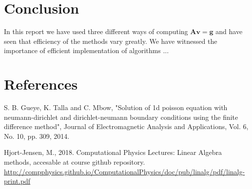 \documentclass[american,a4paper,12pt]{article}
\renewcommand{\vec}[1]{\mathbf{#1}} %
\begin{document}
\section{Conclusion}
In this report we have used three different ways of computing $\vec{A}\vec{v} = \vec{g}$ and have seen that efficiency of the methods vary greatly. We have witnessed the importance of efficient implementation of algorithms ...


\section{References} %

\begin{thebibliography}{9}
   S. B. Gueye, K. Talla and C. Mbow, "Solution of 1d poisson equation with neumann-dirichlet and dirichlet-neumann boundary conditions using the finite difference method", Journal of Electromagnetic Analysis and Applications, Vol. 6, No. 10, pp. 309, 2014.

   Hjort-Jensen, M., 2018. Computational Physics Lectures: Linear Algebra methods,  accesable at course github repository. \url{http://compphysics.github.io/ComputationalPhysics/doc/pub/linalg/pdf/linalg-print.pdf}







\end{thebibliography}
\end{document}
